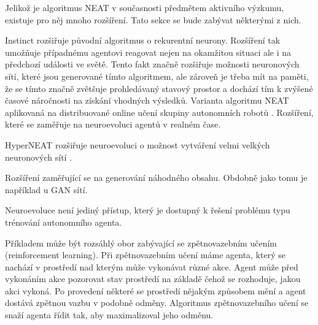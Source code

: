 Jelikož je algoritmus NEAT v současnosti předmětem aktivního výzkumu, existuje pro něj mnoho rozšíření. Tato sekce se bude zabývat některými z nich.

Instinct rozšiřuje původní algoritmus o rekurentní neurony. Rozšíření tak umožňuje případnému agentovi reagovat nejen na okamžitou situaci ale i na předchozí události ve světě. Tento fakt značně rozšiřuje možnosti neuronových sítí, které jsou generované tímto algoritmem, ale zároveň je třeba mít na paměti, že se tímto značně zvětšuje prohledávaný stavový prostor a dochází tím k zvýšené časové náročnosti na získání vhodných výsledků.
Varianta algoritmu NEAT aplikovaná na distribuované online učení skupiny autonomních robotů \cite[s.~1]{odNEAT}.
Rozšíření, které se zaměřuje na neuroevoluci agentů v realném čase.


HyperNEAT rozšiřuje neuroevoluci o možnost vytváření velmi velkých neuronových sítí \cite[s.~1]{hyperNEAT}.

Rozšíření zaměřující se na generování náhodného obsahu. Obdobně jako tomu je například u GAN sítí.

Neuroevoluce není jediný přístup, který je dostupný k řešení problému typu trénování autonomního agenta.

Příkladem může být rozsáhlý obor zabývající se zpětnovazebním učením (reinforcement learning). Při zpětnovazebním učení máme agenta, který se nachází v prostředí nad kterým může vykonávat různé akce. Agent může před vykonáním akce pozorovat stav prostředí na základě čehož se rozhoduje, jakou akci vykoná. Po provedení některé se prostředí nějakým způsobem mění a agent dostává zpětnou vazbu v podobně odměny. Algoritmus zpětnovazebního učení se snaží agenta řídit tak, aby maximalizoval jeho odměnu. 

